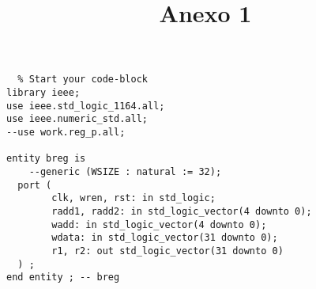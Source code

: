 \documentclass[a4paper]{article}
\title{Anexo 1}
\begin{document}
\lstset{language=VHDL}          %
\maketitle
\begin{lstlisting}  % Start your code-block
library ieee;
use ieee.std_logic_1164.all;
use ieee.numeric_std.all;
--use work.reg_p.all;

entity breg is
    --generic (WSIZE : natural := 32);
  port (
        clk, wren, rst: in std_logic;
        radd1, radd2: in std_logic_vector(4 downto 0);
        wadd: in std_logic_vector(4 downto 0);
        wdata: in std_logic_vector(31 downto 0);
        r1, r2: out std_logic_vector(31 downto 0)
  ) ;
end entity ; -- breg


\end{lstlisting}
\end{document}
